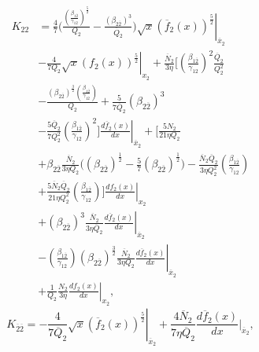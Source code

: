 \documentclass[preprint,12pt]{elsarticle}
\begin{document}
           
            \begin{equation}
                \begin{split}
                          K_{22} &= \frac{4}{7} \biggl( \frac{\left(\frac{\beta_{1\overline{2}}}{\gamma_{12}}\right)^\frac{5}{2}}{Q_{2}} - \frac{\left(\beta_{2\overline{2}
                          }\right)^{3}}{\overline{Q}_{2}} \left. \biggr) \sqrt{x}  (\overline{f}_{2}(x))^\frac{5}{2} \right|_{\overline{x}_{2}} \\ & - \left. \frac{4}{7 Q_{2}} \sqrt{x} (f_{2}(x))^\frac{5}{2} \right|_{x_{2}}  + \frac{\overline{N}_{2}}{3 \eta} \biggl[\left(\frac{\beta_{1\overline{2}}}{\gamma_{12}}\right)^{2} \frac{\overline{Q}_{2}}{Q_{2}^{2}} \\ & - \frac{(\beta_{2\overline{2}})^\frac{3}{2} \left(\frac{\beta_{1\overline{2}}}{\gamma_{12}}\right)}{Q_{2}}   + \frac{5}{7 \overline{Q}_{2}} (\beta_{2\overline{2}})^{3}  \\ &  - \frac{5 \overline{Q}_{2}}{7 Q_{2}^{2}} \left(\frac{\beta_{1\overline{2}}}{\gamma_{12}}\right)^{2} \left. \biggr] \frac{d\overline{f}_{2}(x)}{dx} \right|_{\overline{x}_{2}} + \biggl[ \frac{5 N_{2}}{21 \eta Q_{2}} \\ & + \beta_{2\overline{2}} \frac{\overline{N}_{2}}{3 \eta Q_{2}} \biggl( (\beta_{2\overline{2}})^\frac{1}{2}  - \frac{5}{7} (\beta_{2\overline{2}})^\frac{1}{2} \biggr) - \frac{\overline{N}_{2} \overline{Q}_{2}}{3 \eta Q_{2}^{2}}   \left(\frac{\beta_{1\overline{2}}}{\gamma_{12}}\right)  \\ & + \frac{5 \overline{N}_{2} \overline{Q}_{2}}{21 \eta Q_{2}^{2}} \left(\frac{\beta_{1\overline{2}}}{\gamma_{12}}\right) \left. \biggr] \frac{df_{2}(x)}{dx} \right|_{x_{2}} \\ & + (\beta_{2\overline{2}})^3\frac{\overline{N}_{2}}{3 \eta \overline{Q}_{2} } \left. \frac{d\overline{f}_{2}(x)}{dx} \right|_{\overline{x}_{2}}  \\ &- \left. \left(\frac{\beta_{1\overline{2}}}{\gamma_{12}}\right) (\beta_{2\overline{2}})^\frac{3}{2}\frac{\overline{N}_{2}}{3 \eta Q_2} \frac{d \overline{f}_{2}(x)}{dx} \right|_{\overline{x}_{2}} \\ & + \left. \frac{1}{Q_2} \frac{N_2}{3\eta} \frac{df_2(x)}{dx} \right|_{x_2},
                \end{split}
            \label{eqn:k22_caseI}
            \end{equation}
            \begin{equation}
            K_{\overline{2}\overline{2}} = - \left. \frac{4}{7\overline{Q}_{2}} \sqrt{x} (\overline{f}_{2}(x))^\frac{5}{2} \right|_{\overline{x}_{2}} + \frac{4 \overline{N}_{2}}{7 \eta \overline{Q}_{2}} \frac{d\overline{f}_{2}(x)}{dx}\biggr|_{\overline{x}_{2}},
            \label{eqn:k2bar2bar_caseI}
            \end{equation}
\end{document}
